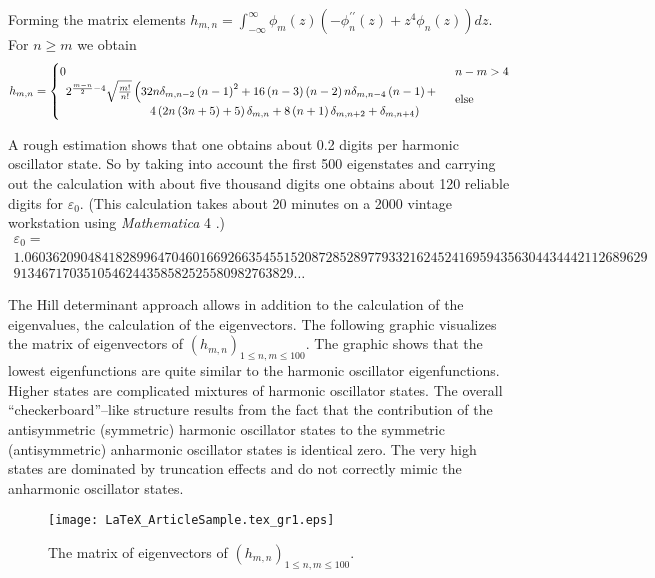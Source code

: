\documentclass{article}
\begin{document}
Forming the matrix elements $h_{m,n}=\int _{-\infty }^{\infty }\phi
_{m}( z) (-\phi _{n}^{{\prime\prime}}( z) +z^{4}\phi _{n}( z) )dz$.
For $n\geq m$ we obtain
\begin{equation}
h_{m,n}=\begin{cases}
0 & n-m>4 \\
\begin{array}{l}
 2^{\frac{m-n}{2}-4} \sqrt{\frac{m!}{n!}} \left( 32 n \delta _{m,n-2}
\left( n-1\right) ^{2}+16 \left( n-3\right)  \left( n-2\right) 
n \delta _{m,n-4} \left( n-1\right) +\right.  \\
 \left. \ \ \ \ \ \ \ \ \ \ \ \ \ \ \ \ \ \ \ \ \ 4 \left( 2 n \left(
3 n+5\right) +5\right)  \delta _{m,n}+8 \left( n+1\right)  \delta
_{m,n+2}+\delta _{m,n+4}\right) 
\end{array} & \textup{else} \\
\end{cases}
\end{equation}

A rough estimation shows that one obtains about 0.2 digits per harmonic
oscillator state. So by taking into account the first 500 eigenstates
and carrying out the calculation with about five thousand digits
one obtains about 120 reliable digits for $\varepsilon _{0}$. (This
calculation takes about 20 minutes on a 2000 vintage workstation
using \textit{Mathematica} 4 \cite{Wolfram99}.) 
\begin{multline*}
\varepsilon _{0}=\\
1.06036209048418289964704601669266354551520872852897793321624524169594356304434442112689629\\
9134671703510546244358582525580982763829\ldots 
\end{multline*}

The Hill determinant approach allows in addition to the calculation
of the eigenvalues, the calculation of the eigenvectors. The following
graphic visualizes the matrix of eigenvectors of $(h_{m,n})_{1\leq
n,m\leq 100}$. The graphic shows that the lowest eigenfunctions
are quite similar to the harmonic oscillator eigenfunctions. Higher
states are complicated mixtures of harmonic oscillator states. The
overall ``checkerboard''--like structure results from the fact that
the contribution of the antisymmetric (symmetric) harmonic oscillator
states to the symmetric (antisymmetric) anharmonic oscillator states
is identical zero. The very high states are dominated by truncation
effects and do not correctly mimic the anharmonic oscillator states.
\begin{figure}[h]
\begin{center}
\texttt{[image: LaTeX\_ArticleSample.tex\_gr1.eps]}

\end{center}
\caption{The matrix of eigenvectors of $(h_{m,n})_{1\leq n,m\leq
100}$.}
\end{figure}
\end{document}
